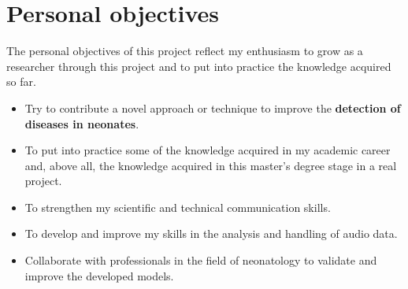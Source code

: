 \newpage
\section{Personal objectives}
The personal objectives of this project reflect my enthusiasm to grow as a researcher through this project and to put into practice the knowledge acquired so far. 
\begin{itemize}
    \item Try to contribute a novel approach or technique to improve the \textbf{detection of diseases in neonates}. 
    \item To put into practice some of the knowledge acquired in my academic career and, above all, the knowledge acquired in this master's degree stage in a real project.
    \item To strengthen my scientific and technical communication skills.
    \item To develop and improve my skills in the analysis and handling of audio data.
    \item Collaborate with professionals in the field of neonatology to validate and improve the developed models.
\end{itemize}